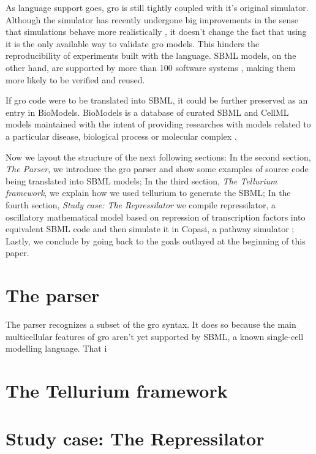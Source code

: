 \documentclass[12pt]{article}
\begin{document}
    As language support goes, gro is still tightly coupled with it's original simulator. Although the simulator has recently undergone big improvements in the sense that simulations behave more realistically \cite{Gutirrez2017}, it doesn't change the fact that using it is the only available way to validate gro models. This hinders the reproducibility of experiments built with the language. SBML models, on the other hand, are supported by more than 100 software systems \cite{Hucka2007}, making them more likely to be verified and reused.
    
    If gro code were to be translated into SBML, it could be further preserved as an entry in BioModels. BioModels is a database of curated SBML and CellML models maintained with the intent of providing researches with models related to a particular disease, biological process or molecular complex \cite{LeNovere2006}. 

    Now we layout the structure of the next following sections: In the second section, \textit{The Parser}, we introduce the gro parser and show some examples of source code being translated into SBML models; In the third section, \textit{The Tellurium framework}, we explain how we used tellurium to generate the SBML; In the fourth section, \textit{Study case: The Repressilator} we compile repressilator, a oscillatory mathematical model based on repression of transcription factors into equivalent SBML code and then simulate it in Copasi, a pathway simulator \cite{Hoops2006}; Lastly, we conclude by going back to the goals outlayed at the beginning of this paper.
    
    
\section{The parser}
    The parser recognizes a subset of the gro syntax. It does so because the main multicellular features of gro aren't yet supported by SBML, a known single-cell modelling language. That i

\section{The Tellurium framework}
    \lipsum[1]

\section{Study case: The Repressilator}
    \lipsum[1]
\end{document}
